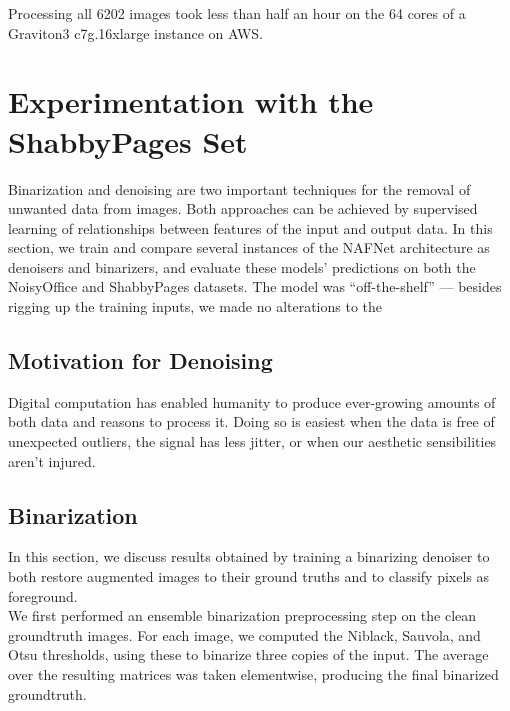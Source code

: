 \documentclass[runningheads]{llncs}
\begin{document}
Processing all 6202 images took less than half an hour on the 64 cores of a Graviton3 c7g.16xlarge instance on AWS.

\section{Experimentation with the ShabbyPages Set}
Binarization and denoising are two important techniques for the removal of unwanted data from images. Both approaches can be achieved by supervised learning of relationships between features of the input and output data. In this section, we train and compare several instances of the NAFNet \cite{ref_NAFNet} architecture as denoisers and binarizers, and evaluate these models' predictions on both the NoisyOffice and ShabbyPages datasets. The model was ``off-the-shelf'' — besides rigging up the training inputs, we made no alterations to the 

\subsection{Motivation for Denoising}
Digital computation has enabled humanity to produce ever-growing amounts of both data and reasons to process it. Doing so is easiest when the data is free of unexpected outliers, the signal has less jitter, or when our aesthetic sensibilities aren't injured.\\

\subsection{Binarization}
In this section, we discuss results obtained by training a binarizing denoiser to both restore augmented images to their ground truths and to classify pixels as foreground.\\

We first performed an ensemble binarization preprocessing step on the clean groundtruth images. For each image, we computed the Niblack, Sauvola, and Otsu thresholds, using these to binarize three copies of the input. The average over the resulting matrices was taken elementwise, producing the final binarized groundtruth.
\end{document}
